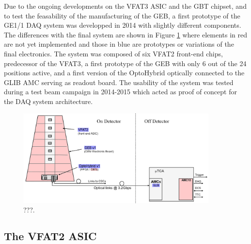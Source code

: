     Due to the ongoing developments on the VFAT3 ASIC and the GBT chipset, and to test the feasability of the manufacturing of the GEB, a first prototype of the GE1/1 DAQ system was developped in 2014 with slightly different components. The differences with the final system are shown in Figure \ref{fig:II-2-gem-system-v1} where elements in red are not yet implemented and those in blue are prototypes or variations of the final electronics. The system was composed of six VFAT2 front-end chips, predecessor of the VFAT3, a first prototype of the GEB with only 6 out of the 24 positions active, and a first version of the OptoHybrid optically connected to the GLIB AMC serving as readout board. The usability of the system was tested during a test beam campaign in 2014-2015 which acted as proof of concept for the DAQ system architecture.

    \begin{figure}[h!]
      \centering
      \includegraphics[width=0.9\textwidth]{img/II-2-daq/gem-system-v1.pdf}
      \caption{???.}
      \label{fig:II-2-gem-system-v1}
    \end{figure}

    \subsection{The VFAT2 ASIC}


